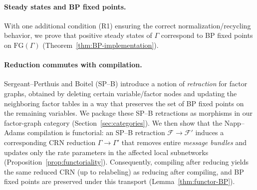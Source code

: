 \documentclass{article}
\theoremstyle{plain}
\theoremstyle{definition}
\theoremstyle{remark}
\newcommand{\<}{\langle}
\renewcommand{\>}{\rangle}
\begin{document}
\paragraph{Steady states and BP fixed points.}
With one additional condition (R1) ensuring the correct normalization/recycling behavior,
we prove that positive steady states of $\Gamma$ correspond to BP fixed points on $\mathrm{FG}(\Gamma)$
(Theorem~\ref{thm:BP-implementation}).

\paragraph{Reduction commutes with compilation.}
Sergeant--Perthuis and Boitel (SP--B) \cite{sergeantperthuis2025minimacriticalpointsbethe} introduce a notion of \emph{retraction} for factor graphs,
obtained by deleting certain variable/factor nodes and updating the neighboring factor tables in a way that preserves
the set of BP fixed points on the remaining variables. We package these SP--B retractions as morphisms in our factor-graph
category (Section~\ref{sec:categories}). We then show that the Napp--Adams compilation is functorial:
an SP--B retraction $\mathcal F \to \mathcal F'$ induces a corresponding CRN reduction $\Gamma \to \Gamma'$ that removes entire
\emph{message bundles} and updates only the rate parameters
in the affected local subnetworks (Proposition~\ref{prop:functoriality}). Consequently, compiling after reducing yields the same
reduced CRN (up to relabeling) as reducing after compiling, and BP fixed points are preserved under this transport
(Lemma~\ref{thm:functor-BP}).
\end{document}
